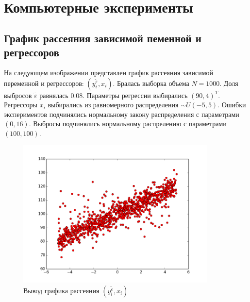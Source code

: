 \section{Компьютерные эксперименты}
\subsection{График рассеяния зависимой пеменной и регрессоров}
На следующем изображении представлен график рассеяния зависимой переменной и регрессоров: $(y_i^{\widetilde{\varepsilon}}, x_i)$.
Бралась выборка объема $N = 1000$. Доля выбросов $\widetilde{\varepsilon}$ равнялась 0.08. 
Параметры регрессии выбирались $(90, 4)^T$. 
Регрессоры $x_i$ выбирались из равномерного распределения $\sim U(-5,5)$. 
Ошибки экспериментов подчинялись нормальному закону распределения с параметрами $(0, 16)$. Выбросы подчинялись нормальному распрелению с параметрами $(100, 100)$. 

\begin{figure}[h!]
    \centering
    \includegraphics[width=100mm]{../images/scatter.png}
    \caption{Вывод графика рассеяния $(y_i^{\widetilde{\varepsilon}}, x_i)$\label{overflow}}
\end{figure}

